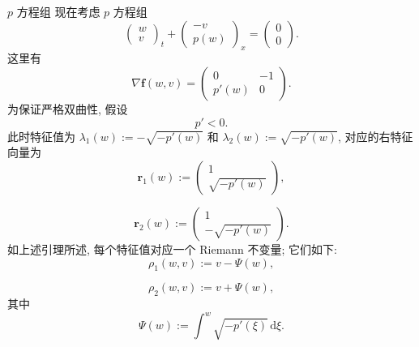 \begin{Example}{$p$ 方程组}
\label{ex:p-system-riemann-invariants}
现在考虑 $p$ 方程组
\begin{equation}\label{eq:p-system-vector-form}
\begin{pmatrix}w\\v\end{pmatrix}_t+\begin{pmatrix}-v\\p(w)\end{pmatrix}_x=\begin{pmatrix}0\\0\end{pmatrix}.
\end{equation}
这里有
\begin{equation}\label{eq:p-system-flux-jacobian}
\nabla\bm{f}(w,v)=\begin{pmatrix}0&-1\\p'(w)&0\end{pmatrix}.
\end{equation}
为保证严格双曲性, 假设
\begin{equation}\label{eq:p-system-strict-hyperbolicity}
p'<0.
\end{equation}
此时特征值为 $\lambda_1(w):=-\sqrt{-p'(w)}$ 和 $\lambda_2(w):=\sqrt{-p'(w)}$, 对应的右特征向量为
\begin{equation}\label{eq:p-system-first-eigenvector}
\bm{r}_1(w):=\begin{pmatrix}1\\\sqrt{-p'(w)}\end{pmatrix},
\end{equation}

\begin{equation}\label{eq:p-system-second-eigenvector}
\bm{r}_2(w):=\begin{pmatrix}1\\-\sqrt{-p'(w)}\end{pmatrix}.
\end{equation}
如上述引理所述, 每个特征值对应一个 Riemann 不变量; 它们如下:
\begin{equation}\label{eq:p-system-first-riemann-invariant}
\rho_1(w,v):=v-\Psi(w),
\end{equation}

\begin{equation}\label{eq:p-system-second-riemann-invariant}
\rho_2(w,v):=v+\Psi(w),
\end{equation}
其中
\begin{equation}\label{eq:p-system-riemann-primitive}
\Psi(w):=\int^w\sqrt{-p'(\xi)}\,\mathrm{d}\xi.
\end{equation}

\end{Example}

